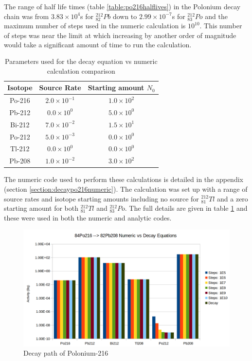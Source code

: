 The range of half life times (table \ref{table:po216halflives}) in the Polonium decay chain was from $3.83 \times 10^4$s for ${}^{212}_{82}Pb$ down to $2.99 \times 10^{-7}$s for ${}^{212}_{83}Po$ and the maximum number of steps used in the numeric calculation is $10^{10}$.  This number of steps was near the limit at which increasing by another order of magnitude would take a significant amount of time to run the calculation. 

\begin{table}[h]
\begin{center}
\begin{tabular}{c c c}
\hline\hline
Isotope & Source Rate & Starting amount $N_0$ \\
\hline\hline
Po-216 & $2.0 \times 10^{-1}$ & $1.0 \times 10^{2}$ \\
Pb-212 & $0.0 \times 10^{0}$  & $5.0 \times 10^{0}$ \\
Bi-212 & $7.0 \times 10^{-2}$ & $1.5 \times 10^{1}$ \\
Po-212 & $5.0 \times 10^{-3}$ & $0.0 \times 10^{0}$ \\
Tl-212 & $0.0 \times 10^{0}$  & $0.0 \times 10^{0}$ \\
Pb-208 & $1.0 \times 10^{-2}$ & $3.0 \times 10^{2}$  \\
\hline\hline
\end{tabular}
\end{center}
\caption{Parameters used for the decay equation vs numeric calculation comparison}
\label{table:po216parameters}
\end{table}

The numeric code used to perform these calculations is detailed in the appendix (section \ref{section:decaypo216numeric}).  The calculation was set up with a range of source rates and isotope starting amounts including no source for ${}^{212}_{81}Tl$ and a zero starting amount for both ${}^{212}_{81}Tl$ and ${}^{212}_{83}Po$.  The full details are given in table \ref{table:po216parameters} and these were used in both the numeric and analytic codes.

\FloatBarrier
\begin{figure}[h]
  \begin{center}
    \includegraphics[width=0.7\linewidth]{chapters/activity_code/84po216/decay_84Po216.png}
    \caption{Decay path of Polonium-216}
    \label{fig:decay_equations_vs_analytic}
  \end{center}
\end{figure}

